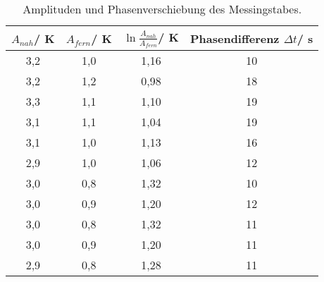 \begin{table}[H]
  \centering
   \begin{tabular}{c c c c}
    \toprule
     $A_{nah}$/ K & $A_{fern}$/ K & $\ln{\frac{A_{nah}}{A_{fern}}}$/ K & Phasendifferenz $\Delta t$/ s\\
    \midrule
    3,2 & 1,0 & 1,16 & 10 \\
    3,2 & 1,2 & 0,98 & 18 \\
    3,3 & 1,1 & 1,10 & 19 \\
    3,1 & 1,1 & 1,04 & 19 \\
    3,1 & 1,0 & 1,13 & 16 \\
    2,9 & 1,0 & 1,06 & 12 \\
    3,0 & 0,8 & 1,32 & 10 \\
    3,0 & 0,9 & 1,20 & 12 \\
    3,0 & 0,8 & 1,32 & 11 \\
    3,0 & 0,9 & 1,20 & 11 \\
    2,9 & 0,8 & 1,28 & 11 \\

    \bottomrule
  \end{tabular}
  \caption{Amplituden und Phasenverschiebung des Messingstabes.}
  \label{tab:tab2}
\end{table}
